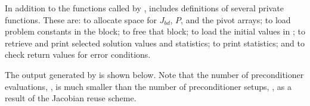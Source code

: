 In addition to the functions called by {\cvode},  includes
definitions of several private functions.  These are: 
to allocate space for $J_{bd}$, $P$, and the pivot arrays; 
to load problem constants in the  block;  to free
that block;  to load the initial values in ; 
 to retrieve and print selected solution values and
statistics;  to print statistics; and 
to check return values for error conditions.

The output generated by  is shown below.  Note that the
number of preconditioner evaluations, , is much smaller than
the number of preconditioner setups, , as a result of the
Jacobian reuse scheme.


